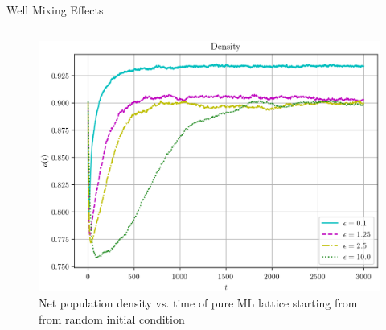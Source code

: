 \documentclass{beamer}
\begin{document}
\begin{frame}[t]{Well Mixing Effects}
\begin{columns}
\begin{column}{0.5\textwidth}
                \vspace{5pt}

                \begin{figure}[h]
                    \centering
                    \includegraphics[width=1\linewidth]{images/densities_try_0.png}

                    \vspace{0pt}

                    \caption{Net population density vs. time of pure ML lattice starting from from random initial
                    condition}
                \end{figure}
            \end{column}
        \end{columns}
        
    \end{frame}



\end{document}
